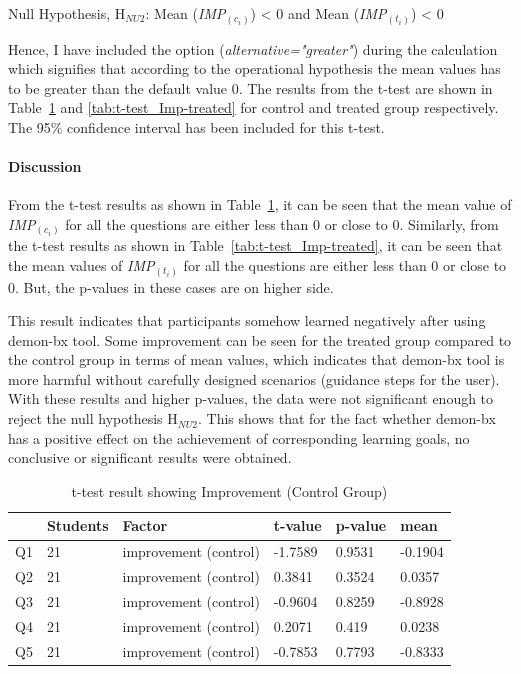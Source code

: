 Null Hypothesis, {H$_{NU2}$}: 
Mean (\textit{IMP$_{(c_i)}$}) < 0 and Mean (\textit{IMP$_{(t_i)}$}) < 0

Hence, I have included the option (\textit{alternative="greater"}) during the calculation which signifies that according to the operational hypothesis the mean values has to be greater than the default value 0. The results from the t-test are shown in Table~\ref{tab:t-test_Imp-control} and \ref{tab:t-test_Imp-treated} for control and treated group respectively. The 95\% confidence interval has been included for this t-test.

\paragraph{Discussion}
From the t-test results as shown in Table~\ref{tab:t-test_Imp-control}, it can be seen that the mean value of \textit{IMP$_{(c_i)}$} for all the questions are either less than 0 or close to 0.
Similarly, from the t-test results as shown in Table~\ref{tab:t-test_Imp-treated}, it can be seen that the mean values of \textit{IMP$_{(t_i)}$} for all the questions are either less than 0 or close to 0. But, the p-values in these cases are on higher side. 

This result indicates that participants somehow learned negatively after using demon-bx tool. 
Some improvement can be seen for the treated group compared to the control group in terms of mean values, which indicates that demon-bx tool is more harmful without carefully designed scenarios (guidance steps for the user). With these results and higher p-values, the data were not significant enough to reject the null hypothesis {H$_{NU2}$}. This shows that for the fact whether demon-bx has a positive effect on the achievement of corresponding learning goals, no conclusive or significant results were obtained.

\begin{table}[ht]
	\centering	
	\begin{tabular}{|p{1cm}|p{1.5cm}|p{4.5cm}|p{1.5cm}|p{1.5cm}|p{1.5cm}|}
		\hline
		\rowcolor[gray]{.8}	
		\textbf{} & \textbf{Students} & \textbf{Factor} & \textbf{t-value} & \textbf{p-value} & \textbf{mean}\\
		\hline
		Q1 & 21 & improvement (control) &  -1.7589 & 0.9531 & -0.1904\\
		\hline
		Q2 & 21 & improvement (control) & 0.3841 & 0.3524 & 0.0357\\
		\hline
		Q3 & 21 & improvement (control) & -0.9604 & 0.8259 & -0.8928\\
		\hline	
		Q4 & 21 & improvement (control) & 0.2071 & 0.419 & 0.0238\\
		\hline
		Q5 & 21 & improvement (control) & -0.7853 & 0.7793 & -0.8333\\
		\hline			
	\end{tabular}
	\caption{t-test result showing Improvement (Control Group)}
	\label{tab:t-test_Imp-control}
\end{table}

